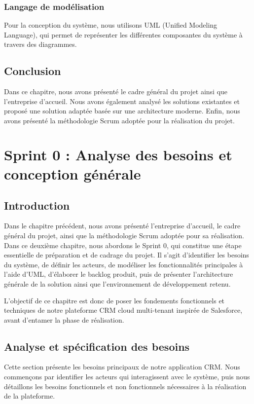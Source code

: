 \documentclass[12pt,a4paper,twoside,openany]{book}
\begin{document}
\subsection{Langage de modélisation}

Pour la conception du système, nous utilisons UML (Unified Modeling Language), qui permet de représenter les différentes composantes du système à travers des diagrammes.

\section*{Conclusion}

Dans ce chapitre, nous avons présenté le cadre général du projet ainsi que l’entreprise d’accueil. Nous avons également analysé les solutions existantes et proposé une solution adaptée basée sur une architecture moderne. Enfin, nous avons présenté la méthodologie Scrum adoptée pour la réalisation du projet.

\chapter{Sprint 0 : Analyse des besoins et conception générale}

\section*{Introduction}

Dans le chapitre précédent, nous avons présenté l’entreprise d’accueil, le cadre général du projet, ainsi que la méthodologie Scrum adoptée pour sa réalisation. Dans ce deuxième chapitre, nous abordons le Sprint 0, qui constitue une étape essentielle de préparation et de cadrage du projet. Il s’agit d’identifier les besoins du système, de définir les acteurs, de modéliser les fonctionnalités principales à l’aide d’UML, d’élaborer le backlog produit, puis de présenter l’architecture générale de la solution ainsi que l’environnement de développement retenu.

L’objectif de ce chapitre est donc de poser les fondements fonctionnels et techniques de notre plateforme CRM cloud multi-tenant inspirée de Salesforce, avant d’entamer la phase de réalisation.

\section{Analyse et spécification des besoins}
Cette section présente les besoins principaux de notre application CRM. Nous commençons par identifier les acteurs qui interagissent avec le système, puis nous détaillons les besoins fonctionnels et non fonctionnels nécessaires à la réalisation de la plateforme.
\end{document}

